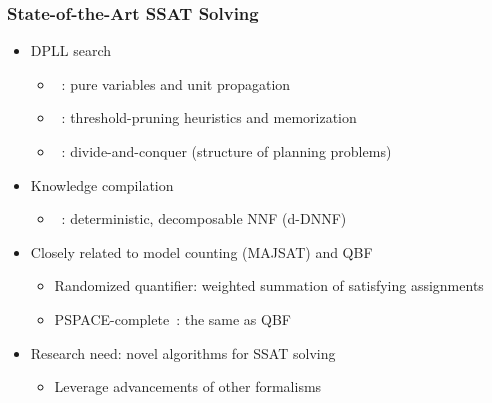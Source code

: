 \begin{frame}
      \frametitle{State-of-the-Art SSAT Solving}
      \begin{itemize}
            \item DPLL search~\cite{Davis1962}
                  \begin{itemize}
                        \item \maxplan~\cite{Majercik1998}: pure variables and unit propagation
                        \item \zander~\cite{Majercik2003}: threshold-pruning heuristics and memorization
                        \item \dcssat~\cite{Majercik2005}: divide-and-conquer (structure of planning problems)
                  \end{itemize}
                  \pause
            \item Knowledge compilation~\cite{Darwiche2002KnowledgeCompilation}
                  \begin{itemize}
                        \item \complan~\cite{Huang2006}: deterministic, decomposable NNF (d-DNNF)~\cite{Darwiche2001,Darwiche2002dDNNF}
                  \end{itemize}
                  \pause
            \item Closely related to model counting (MAJSAT) and QBF
                  \begin{itemize}
                        \item Randomized quantifier: weighted summation of satisfying assignments
                        \item PSPACE-complete~\cite{Stockmeyer1973}: the same as QBF
                  \end{itemize}
                  \pause
            \item \alert{Research need: novel algorithms for SSAT solving}
                  \begin{itemize}
                        \item Leverage advancements of other formalisms
                  \end{itemize}
      \end{itemize}
\end{frame}

